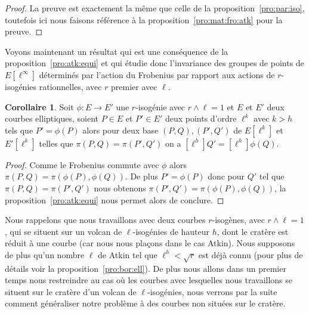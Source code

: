 \documentclass[10pt,a4paper]{book}
\theoremstyle{plain}
\theoremstyle{definition}
\theoremstyle{definition}
\theoremstyle{definition}
\newtheorem{cor}[thm]{Corollaire}
\theoremstyle{definition}
\theoremstyle{definition}
\theoremstyle{remark}
\theoremstyle{remark}
\theoremstyle{definition}
\begin{document}
\begin{proof}
La preuve est exactement la même que celle de la proposition~\ref{pro:par:iso},
toutefois ici nous faisons référence à la proposition~\ref{pro:mat:fro:atk} 
pour la preuve.
\end{proof}

Voyons maintenant un résultat qui est une conséquence de la 
proposition~\ref{pro:atk:equi} et qui étudie donc l'invariance des groupes 
de points de $E[\ell^{\infty}]$ déterminés par l'action du Frobenius 
par rapport aux actions de $r$-isogénies rationnelles, avec $r$ premier avec 
$\ell$.

\begin{cor}\label{cor:atk:ess}
Soit $\phi:E \rightarrow E'$ une $r$-isogénie avec $r \wedge \ell=1$ et $E$ et 
$E'$ deux courbes elliptiques, 
soient $P \in E$ et $P' \in E'$ deux points d'ordre $\ell^k$ avec $k>h$ tels 
que $P'=\phi(P)$ alors pour deux base $(P,Q),(P',Q')$ de $E[\ell^k]$ et 
$E'[\ell^k]$ telles que $\pi(P,Q)=\pi(P',Q')$ on a $[\ell^h]Q'=[\ell^h]\phi(Q)$. 
\end{cor}

\begin{proof}
Comme le Frobenius commute avec $\phi$ alors $\pi(P,Q)=\pi(\phi(P),\phi(Q))$.
De plus $P'=\phi(P)$ donc pour $Q'$ tel que $\pi(P,Q)=\pi(P',Q')$ nous obtenons 
$\pi(P',Q')=\pi(\phi(P),\phi(Q))$, la proposition~\ref{pro:atk:equi} nous 
permet alors de conclure.
\end{proof}


Nous rappelons que nous travaillons avec deux courbes $r$-isogènes, avec $r 
\wedge \ell=1$, qui se situent sur un volcan de $\ell$-isogénies de hauteur 
$h$, dont le cratère est réduit à une courbe (car nous nous plaçons dans le cas
Atkin). Nous supposons de plus qu'un nombre $\ell$ de Atkin tel que 
$\ell^h<\sqrt{r}$ est déjà connu (pour plus de détails voir la 
proposition~\ref{pro:bor:ell}). De plus nous allons dans un premier temps nous 
restreindre au cas où les courbes avec lesquelles nous travaillons se situent 
sur le cratère d'un volcan de $\ell$-isogénies, nous verrons par la suite 
comment généraliser notre problème à des courbes non situées sur le cratère.
\end{document}

